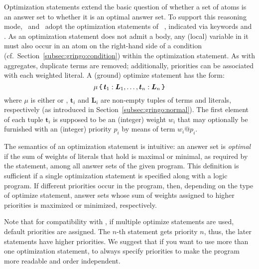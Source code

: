 Optimization statements extend the basic question of
whether a set of atoms is an answer set to
whether it is an optimal answer set.
To support this reasoning mode, \gringo\ and \clingo\ adopt the
optimization statements of \lparse~\cite{lparseManual},
indicated via keywords  and .
As an optimization statement does not admit a body, any (local) variable
in it must also occur in an atom 
on the right-hand side of a condition (cf.\ Section~\ref{subsec:gringo:condition})
within the optimization statement.
As with aggregates, duplicate terms are removed;
additionally, priorities can be associated with each weighted literal.
A (ground) optimize statement has the form: 
%
%
\[
\mathsf{\mu}\,\texttt{\{}\,\boldsymbol{t}_1:\boldsymbol{L}_1,\dots,\boldsymbol{t}_n:\boldsymbol{L}_n\,\texttt{\}}
\] 
where $\mathsf{\mu}$ is either  or , 
$\boldsymbol{t}_i$ and $\boldsymbol{L}_i$ are non-empty tuples of terms and literals, respectively
(as introduced in Section~\ref{subsec:gringo:normal}).
The first element of each tuple $\boldsymbol{t}_i$ is supposed to be an (integer) weight $w_i$
that may optionally be furnished with an (integer) priority $p_i$ by means of term $w_i@p_i$.

The semantics of an optimization statement is intuitive:
an answer set is \emph{optimal} if the sum of weights
of literals that hold is maximal or minimal, as required by the statement,
among all answer sets of the given program.
This definition is sufficient if a single optimization statement is specified
along with a logic program.
If different priorities occur in the program, 
then, depending on the type of optimize statement,
answer sets whose sum of weights assigned to higher priorities
is maximized or minimized, respectively.

Note that for compatibility with \lparse, if multiple optimize statements are used, 
default priorities are assigned.
The $n$-th statement gets priority $n$, thus, the later statements have higher priorities.
We suggest that if you want to use more than one optimization statement,
to always specify priorities to make the program more readable and order independent.

